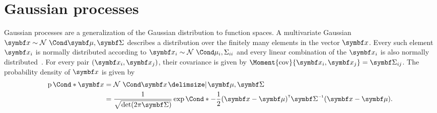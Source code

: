 \section{Gaussian processes}
Gaussian processes are a generalization of the Gaussian distribution to function spaces.
A multivariate Gaussian $\mat{x} \sim \Gaussian{\mat{\mu}, \mat{\Sigma}}$ describes a distribution over the finitely many elements in the vector $\mat{x}$.
Every such element $\rv{x}_i$ is normally distributed according to $\rv{x}_i \sim \Gaussian{\mu_i, \Sigma_{ii}}$ and every linear combination of the $\mat{x}_i$ is also normally distributed~\parencite{astrom_introduction_1971}.
For every pair $(\rv{x}_i, \rv{x}_j)$, their covariance is given by $\Moment{\cov}{\rv{x}_i, \rv{x}_j} = \mat{\Sigma}_{ij}$.
The probability density of $\mat{x}$ is given by
\begin{align}
    \begin{split}
        \label{eq:gaussian_pdf}
        \Prob*{\mat{x}}
        &= \Gaussian{\mat{x} \given \mat{\mu}, \mat{\Sigma}} \\
        &= \frac{1}{\sqrt{\det(2\pi\mat{\Sigma})}}\Fun*{\exp}{-\frac{1}{2}(\mat{x} - \mat{\mu})\tran \mat{\Sigma}\inv (\mat{x} - \mat{\mu})}.
    \end{split}
\end{align}

